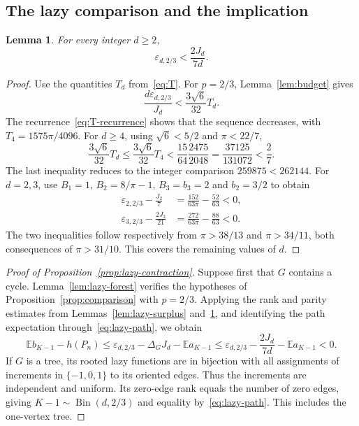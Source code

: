 \documentclass[11pt,reqno]{amsart}
\newtheorem{lemma}[theorem]{Lemma}
\theoremstyle{remark}
\numberwithin{equation}{section}
\newcommand{\E}{\mathbb E}
\DeclareMathOperator{\Bin}{Bin}
\begin{document}
\subsection{The lazy comparison and the implication}

\begin{lemma}\label{lem:lazy-budget}
For every integer $d\ge2$,
\begin{equation}\label{eq:lazy-budget}
 \varepsilon_{d,2/3}<\frac{2J_d}{7d}.
\end{equation}
\end{lemma}

\begin{proof}
Use the quantities $T_d$ from~\eqref{eq:T}. For $p=2/3$,
Lemma~\ref{lem:budget} gives
\[
 \frac{d\varepsilon_{d,2/3}}{J_d}<\frac{3\sqrt6}{32}T_d.
\]
The recurrence~\eqref{eq:T-recurrence} shows that the sequence decreases, with
$T_4=1575\pi/4096$. For $d\ge4$, using $\sqrt6<5/2$ and $\pi<22/7$,
\[
 \frac{3\sqrt6}{32}T_d
 \le\frac{3\sqrt6}{32}T_4
 <\frac{15}{64}\frac{2475}{2048}
 =\frac{37125}{131072}<\frac27.
\]
The last inequality reduces to the integer comparison $259875<262144$.
For $d=2,3$, use $B_1=1$, $B_2=8/\pi-1$, $B_3=b_3=2$ and
$b_2=3/2$ to obtain
\begin{align*}
 \varepsilon_{2,2/3}-\frac{J_2}{7}
     &=\frac{152}{63\pi}-\frac{52}{63}<0,\\
 \varepsilon_{3,2/3}-\frac{2J_3}{21}
     &=\frac{272}{63\pi}-\frac{88}{63}<0.
\end{align*}
The two inequalities follow respectively from $\pi>38/13$ and
$\pi>34/11$, both consequences of $\pi>31/10$. This covers the remaining
values of $d$.
\end{proof}

\begin{proof}[Proof of Proposition~\ref{prop:lazy-contraction}]
Suppose first that $G$ contains a cycle. Lemma~\ref{lem:lazy-forest}
verifies the hypotheses of Proposition~\ref{prop:comparison} with
$p=2/3$. Applying the rank and parity estimates from
Lemmas~\ref{lem:lazy-surplus} and~\ref{lem:lazy-budget}, and identifying
the path expectation through~\eqref{eq:lazy-path}, we obtain
\[
 \E b_{K-1}-h(P_n)
 \le\varepsilon_{d,2/3}-\Delta_G J_d-\E a_{K-1}
 \le\varepsilon_{d,2/3}-\frac{2J_d}{7d}-\E a_{K-1}<0.
\]
If $G$ is a tree, its rooted lazy functions are in bijection with all
assignments of increments in $\{-1,0,1\}$ to its oriented edges.
Thus the increments are independent and uniform. Its zero-edge rank
equals the number of zero edges, giving $K-1\sim\Bin(d,2/3)$ and
equality by~\eqref{eq:lazy-path}. This includes the one-vertex tree.
\end{proof}
\end{document}
